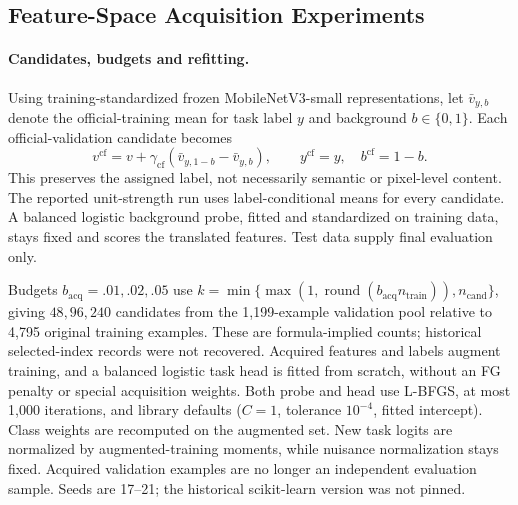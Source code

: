 \subsection{Feature-Space Acquisition Experiments}
\label{app:feature-acquisition}

\paragraph{Candidates, budgets and refitting.}
Using training-standardized frozen MobileNetV3-small representations, let $\bar v_{y,b}$ denote the official-training mean for task label $y$ and background $b\in\{0,1\}$. Each official-validation candidate becomes
\begin{equation}
v^{\mathrm{cf}}=v+\gamma_{\mathrm{cf}}(\bar v_{y,1-b}-\bar v_{y,b}),
\qquad y^{\mathrm{cf}}=y,\quad b^{\mathrm{cf}}=1-b .
\label{eq:feature-counterfactual}
\end{equation}
This preserves the assigned label, not necessarily semantic or pixel-level content. The reported unit-strength run uses label-conditional means for every candidate. A balanced logistic background probe, fitted and standardized on training data, stays fixed and scores the translated features. Test data supply final evaluation only.

Budgets $b_{\mathrm{acq}}=.01,.02,.05$ use $k=\min\{\max(1,\operatorname{round}(b_{\mathrm{acq}}n_{\mathrm{train}})),n_{\mathrm{cand}}\}$, giving $48,96,240$ candidates from the 1,199-example validation pool relative to 4,795 original training examples. These are formula-implied counts; historical selected-index records were not recovered. Acquired features and labels augment training, and a balanced logistic task head is fitted from scratch, without an FG penalty or special acquisition weights. Both probe and head use L-BFGS, at most 1,000 iterations, and library defaults ($C=1$, tolerance $10^{-4}$, fitted intercept). Class weights are recomputed on the augmented set. New task logits are normalized by augmented-training moments, while nuisance normalization stays fixed. Acquired validation examples are no longer an independent evaluation sample. Seeds are 17--21; the historical scikit-learn version was not pinned.

